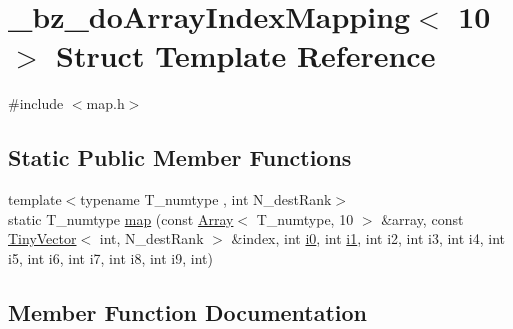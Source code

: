 \hypertarget{struct__bz__doArrayIndexMapping_3_0110_01_4}{}\section{\+\_\+bz\+\_\+do\+Array\+Index\+Mapping$<$ 10 $>$ Struct Template Reference}
\label{struct__bz__doArrayIndexMapping_3_0110_01_4}


{\ttfamily \#include $<$map.\+h$>$}

\subsection*{Static Public Member Functions}
\begin{DoxyCompactItemize}
\item 
{\footnotesize template$<$typename T\+\_\+numtype , int N\+\_\+dest\+Rank$>$ }\\static T\+\_\+numtype \hyperlink{struct__bz__doArrayIndexMapping_3_0110_01_4_a43ac9af95f210b3de8e57a670f03e6a0}{map} (const \hyperlink{classArray}{Array}$<$ T\+\_\+numtype, 10 $>$ \&array, const \hyperlink{classTinyVector}{Tiny\+Vector}$<$ int, N\+\_\+dest\+Rank $>$ \&index, int \hyperlink{cephes_8h_aacd2643d920288e61be16787561a4514}{i0}, int \hyperlink{cephes_8h_ab24474d03df1f9adf1700c2c1badd1a5}{i1}, int i2, int i3, int i4, int i5, int i6, int i7, int i8, int i9, int)
\end{DoxyCompactItemize}


\subsection{Member Function Documentation}
\hypertarget{struct__bz__doArrayIndexMapping_3_0110_01_4_a43ac9af95f210b3de8e57a670f03e6a0}{}
